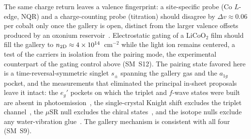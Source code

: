 \documentclass[aps,prl,twocolumn,superscriptaddress,floatfix]{revtex4-2}
\begin{document}
The same charge return leaves a valence fingerprint: a site-specific probe (Co $L$-edge, NQR) and
a charge-counting probe (titration) should disagree by $\Delta v\approx0.06$ per cobalt only once
the gallery is open, distinct from the larger valence offsets produced by an oxonium
reservoir~\cite{Milne2004}. Electrostatic gating of a LiCoO$_2$ film should fill the gallery to
$n_{\rm 2D}\approx4\times10^{14}$~cm$^{-2}$ while the light ion remains centered, a test of the
carriers in isolation from the pairing mode, the experimental counterpart of the gating control
above (SM~S12). 
The pairing state favored here is a time-reversal-symmetric singlet $s_\pm$ spanning the gallery
gas and the $a_{1g}$ pocket, and the measurements that eliminated the principal in-sheet
proposals leave it intact: the $e_g'$ pockets on which the triplet and $f$-wave states were
built~\cite{TanakaHu2003,KurokiTanakaArita2004} are absent in photoemission~\cite{Geck2007}, the
single-crystal Knight shift excludes the triplet channel~\cite{Sakurai2015}, the $\mu$SR null
excludes the chiral states~\cite{Higemoto2004,Kiesel2013}, and the isotope nulls exclude any
water-vibration glue~\cite{Jin2003,Yokoi2008}. The gallery mechanism is consistent with all four
(SM~S9).
\end{document}
